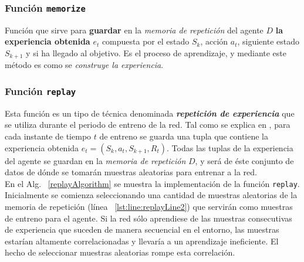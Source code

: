 \subsubsection{Función \texttt{memorize}}

Función que sirve para \textbf{guardar} en la \textit{memoria de repetición} del agente $D$ \textbf{la experiencia obtenida} $e_t$ compuesta por el estado $S_k$, acción $a_t$, siguiente estado $S_{k+1}$ y si ha llegado al objetivo. Es el proceso de aprendizaje, y mediante este método es como se \textit{construye la experiencia}. 

\subsubsection{Función \texttt{replay}}

Esta función es un tipo de técnica denominada \textbf{\textit{repetición de experiencia}} que se utiliza durante el periodo de entreno de la red. Tal como se explica en \cite{stack2017expreplay, deeplizardReplay}, para cada instante de tiempo $t$ de entreno se guarda una tupla que contiene la experiencia obtenida $e_t = (S_k, a_t, S_{k + 1}, R_t)$. Todas las tuplas de la experiencia del agente se guardan en la \textit{memoria de repetición} $D$, y será de éste conjunto de datos de dónde se tomarán muestras aleatorias para entrenar a la red. \\

En el Alg. ~\ref{replayAlgorithm} se muestra la implementación de la función \texttt{replay}. Inicialmente se comienza seleccionando una cantidad de muestras aleatorias de la memoria de repetición (línea ~\ref{lst:line:replayLine2}) que servirán como muestras de entreno para el agente. Si la red sólo aprendiese de las muestras consecutivas de experiencia que suceden de manera secuencial en el entorno, las muestras estarían altamente correlacionadas y llevaría a un aprendizaje ineficiente. El hecho de seleccionar muestras aleatorias rompe esta correlación. \\

